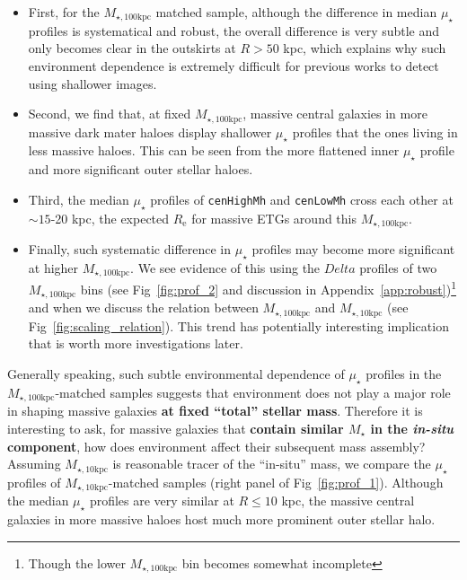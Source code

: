 \documentclass[a4paper,fleqn,usenatbib]{mnras}
\def\rbcg{\texttt{cenHighMh}}
\def\nbcg{\texttt{cenLowMh}}
\def\mstar{{$M_{\star}$}}
\def\minn{{$M_{\star,10\mathrm{kpc}}$}}
\def\mtot{{$M_{\star,100\mathrm{kpc}}$}}
\def\mden{{$\mu_{\star}$}}
\begin{document}
    \begin{itemize}
        
        \item First, for the \mtot{} matched sample, although the difference in 
            median \mden{} profiles is systematical and robust, the overall difference 
            is very subtle and only becomes clear in the outskirts at $R>50$ kpc, 
            which explains why such environment dependence is extremely difficult 
            for previous works to detect using shallower images.
            
        \item Second, we find that, at fixed \mtot{}, massive central galaxies in 
            more massive dark mater haloes display shallower \mden{} profiles that the 
            ones living in less massive haloes. 
            This can be seen from the more flattened inner \mden{} profile and more 
            significant outer stellar haloes.
        
        \item Third, the median \mden{} profiles of \rbcg{} and \nbcg{} cross each 
            other at ${\sim} 15$-20 kpc, the expected $R_{\mathrm{e}}$ for massive 
            ETGs around this \mtot{}. 
        
        \item Finally, such systematic difference in \mden{} profiles may become more 
            significant at higher \mtot{}.
            We see evidence of this using the $Delta$ profiles of two \mtot{} 
            bins (see Fig~\ref{fig:prof_2} and discussion in 
            Appendix~\ref{app:robust})\footnote{Though the lower \mtot{} bin becomes 
            somewhat incomplete} and when we discuss the relation between \mtot{} and 
            \minn{} (see Fig~\ref{fig:scaling_relation}). 
            This trend has potentially interesting implication that is worth more 
            investigations later.  
            
    \end{itemize}

    Generally speaking, such subtle environmental dependence of \mden{} profiles in 
    the \mtot{}-matched samples suggests that environment does not play a major role 
    in shaping massive galaxies \textbf{at fixed ``total'' stellar mass}.
    Therefore it is interesting to ask, for massive galaxies that \textbf{contain 
    similar \mstar{} in the \textit{in-situ} component}, how does environment affect 
    their subsequent mass assembly?
    Assuming \minn{} is reasonable tracer of the ``in-situ'' mass, we compare the 
    \mden{} profiles of \minn{}-matched samples (right panel of Fig~\ref{fig:prof_1}).  
    Although the median \mden{} profiles are very similar at $R \leq 10$ kpc, the
    massive central galaxies in more massive haloes host much more prominent outer 
    stellar halo. 
    
\end{document}
